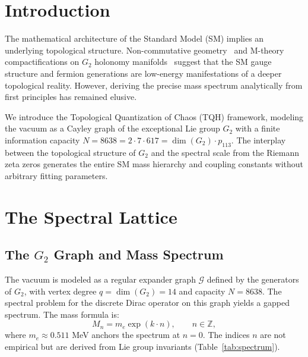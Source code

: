 \documentclass[reprint,aps,prd,twocolumn,showkeys,nofootinbib]{revtex4-2}
\begin{document}
\maketitle

\section{Introduction}

The mathematical architecture of the Standard Model (SM) implies an underlying topological structure. Non-commutative geometry~\cite{Chamseddine1997} and M-theory compactifications on $G_2$ holonomy manifolds~\cite{Acharya2002,Joyce2000} suggest that the SM gauge structure and fermion generations are low-energy manifestations of a deeper topological reality. However, deriving the precise mass spectrum analytically from first principles has remained elusive.

We introduce the Topological Quantization of Chaos (TQH) framework, modeling the vacuum as a Cayley graph of the exceptional Lie group $G_2$ with a finite information capacity $N=8638 = 2\cdot7\cdot617 = \dim(G_2)\cdot p_{113}$. The interplay between the topological structure of $G_2$ and the spectral scale from the Riemann zeta zeros generates the entire SM mass hierarchy and coupling constants without arbitrary fitting parameters.

\section{The Spectral Lattice}

\subsection{The $G_2$ Graph and Mass Spectrum}
The vacuum is modeled as a regular expander graph $\mathcal{G}$ defined by the generators of $G_2$, with vertex degree $q=\dim(G_2)=14$ and capacity $N=8638$. The spectral problem for the discrete Dirac operator on this graph yields a gapped spectrum. The mass formula is:
\begin{equation}
M_n = m_e \exp(k \cdot n),\qquad n\in\mathbb{Z},
\label{eq:mass}
\end{equation}
where $m_e\approx0.511$ MeV anchors the spectrum at $n=0$. The indices $n$ are not empirical but are derived from Lie group invariants (Table~\ref{tab:spectrum}).
\end{document}
